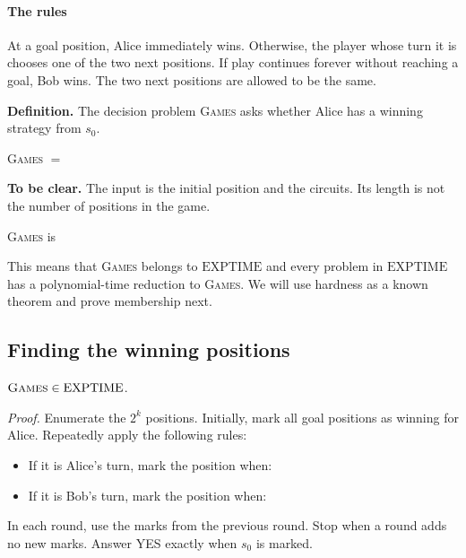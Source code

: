 \documentclass[11  pt]{article}
\begin{document}
\paragraph{The rules}
At a goal position, Alice immediately wins. Otherwise, the player whose turn it is chooses one of the two next positions. If play continues forever without reaching a goal, Bob wins. The two next positions are allowed to be the same.

\textbf{Definition.} The decision problem \textsc{Games} asks whether Alice has a winning strategy from $s_0$.
\begin{center}
    \textsc{Games} $=\phantom{\{\langle s_0,O,G,N_0,N_1\rangle:\text{Alice has a winning strategy}\}}$
\end{center}

\textbf{To be clear.} The input is the initial position and the circuits. Its length is not the number of positions in the game.

\begin{theorem}
    \textsc{Games} is 
\end{theorem}
This means that \textsc{Games} belongs to $\mathrm{EXPTIME}$ and every problem in $\mathrm{EXPTIME}$ has a polynomial-time reduction to \textsc{Games}. We will use hardness as a known theorem and prove membership next.

\newpage
\subsection*{Finding the winning positions}
\begin{theorem}
    $\textsc{Games}\in\mathrm{EXPTIME}$.
\end{theorem}

\textit{Proof.} Enumerate the $2^k$ positions. Initially, mark all goal positions as winning for Alice. Repeatedly apply the following rules:
\begin{itemize}
    \item If it is Alice's turn, mark the position when:
    \vs{.5cm}
    \item If it is Bob's turn, mark the position when:
    \vs{.5cm}
\end{itemize}
In each round, use the marks from the previous round. Stop when a round adds no new marks. Answer YES exactly when $s_0$ is marked.
\end{document}
